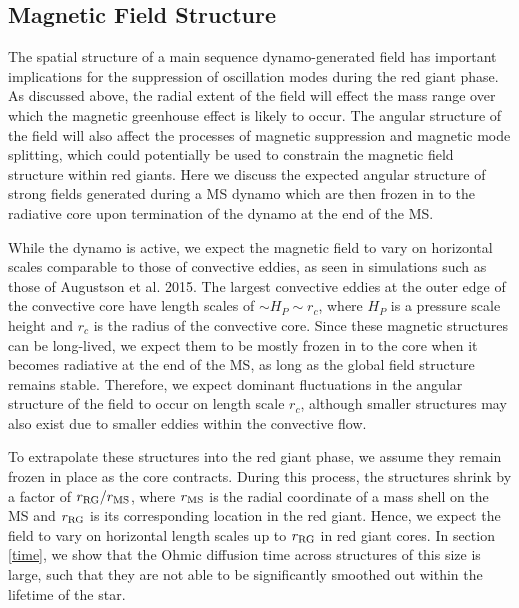 \subsection{Magnetic Field Structure}
\label{fieldstruc}

The spatial structure of a main sequence dynamo-generated field has important implications for the suppression of oscillation modes during the red giant phase. As discussed above, the radial extent of the field will effect the mass range over which the magnetic greenhouse effect is likely to occur. The angular structure of the field will also affect the processes of magnetic suppression and magnetic mode splitting, which could potentially be used to constrain the magnetic field structure within red giants. Here we discuss the expected angular structure of strong fields generated during a MS dynamo which are then frozen in to the radiative core upon termination of the dynamo at the end of the MS.

While the dynamo is active, we expect the magnetic field to vary on horizontal scales comparable to those of convective eddies, as seen in simulations such as those of Augustson et al. 2015. The largest convective eddies at the outer edge of the convective core have length scales of $\sim \! H_P \sim \! r_c$, where $H_P$ is a pressure scale height and $r_c$ is the radius of the convective core. Since these magnetic structures can be long-lived, we expect them to be mostly frozen in to the core when it becomes radiative at the end of the MS, as long as the global field structure remains stable. Therefore, we expect dominant fluctuations in the angular structure of the field to occur on length scale $r_c$, although smaller structures may also exist due to smaller eddies within the convective flow.

To extrapolate these structures into the red giant phase, we assume they remain frozen in place as the core contracts. During this process, the structures shrink by a factor of $r_{\rm RG}/r_{\rm MS}$, where $r_{\rm MS}$ is the radial coordinate of a mass shell on the MS and $r_{\rm RG}$ is its corresponding location in the red giant. Hence, we expect the field to vary on horizontal length scales up to $r_{\rm RG}$ in red giant cores. In section \ref{time}, we show that the Ohmic diffusion time across structures of this size is large, such that they are not able to be significantly smoothed out within the lifetime of the star.